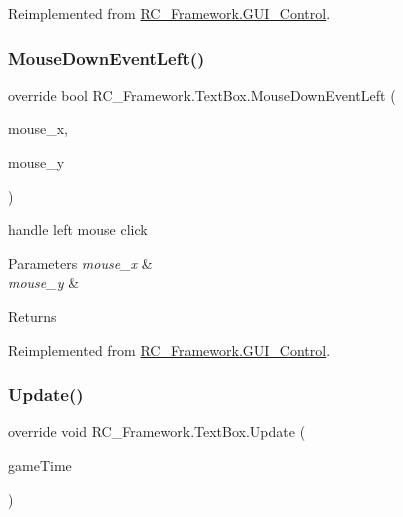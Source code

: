 Reimplemented from \mbox{\hyperlink{class_r_c___framework_1_1_g_u_i___control_a458eb00bda180db22ebe22e550a669a4}{R\+C\+\_\+\+Framework.\+G\+U\+I\+\_\+\+Control}}.

\mbox{\label{class_r_c___framework_1_1_text_box_a73f9a94392ff9bf3639a37a29470fb63}} 
\subsubsection{\texorpdfstring{Mouse\+Down\+Event\+Left()}{MouseDownEventLeft()}}
{\footnotesize\ttfamily override bool R\+C\+\_\+\+Framework.\+Text\+Box.\+Mouse\+Down\+Event\+Left (\begin{DoxyParamCaption}\item[{float}]{mouse\+\_\+x,  }\item[{float}]{mouse\+\_\+y }\end{DoxyParamCaption})\hspace{0.3cm}{\ttfamily [virtual]}}



handle left mouse click 


\begin{DoxyParams}{Parameters}
{\em mouse\+\_\+x} & \\
\hline
{\em mouse\+\_\+y} & \\
\hline
\end{DoxyParams}
\begin{DoxyReturn}{Returns}

\end{DoxyReturn}


Reimplemented from \mbox{\hyperlink{class_r_c___framework_1_1_g_u_i___control_a005e7f109afd21abd6576fdf70212af5}{R\+C\+\_\+\+Framework.\+G\+U\+I\+\_\+\+Control}}.

\mbox{\label{class_r_c___framework_1_1_text_box_ad0faeeb8a2ffc1a9fc593e58a80e8376}} 
\subsubsection{\texorpdfstring{Update()}{Update()}}
{\footnotesize\ttfamily override void R\+C\+\_\+\+Framework.\+Text\+Box.\+Update (\begin{DoxyParamCaption}\item[{Game\+Time}]{game\+Time }\end{DoxyParamCaption})\hspace{0.3cm}{\ttfamily [virtual]}}



